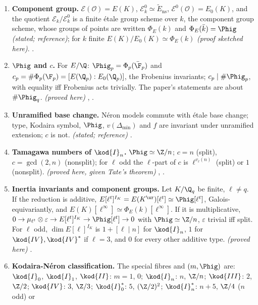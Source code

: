\begin{enumerate}[label=\textbf{\thechapter.\arabic*}]
N\'eron mapping property) exists and is unique; it is the smooth locus of the minimal regular model. \emph{(stated; reference)}
, .
\item \textbf{Component group.} $\mathcal E(\mathcal O)=E(K)$, $\mathcal E_k^0\simeq\tilde E_{\mathrm{ns}}$, $\mathcal E^0(\mathcal O)=E_0(K)$, and
the quotient $\mathcal E_k/\mathcal E_k^0$ is a finite \'etale group scheme over $k$, the component group scheme, whose groups of points
are written $\Phi_E(k)$ and $\Phi_E(\bar k)=\Phig$ \emph{(stated; reference)}; for $k$ finite $E(K)/E_0(K)\simeq\Phi_E(k)$
\emph{(proof sketched here)}. .
\item \textbf{$\Phig$ and $c$.} For $E/\Q$: $\Phig_p=\Phi_p(\bar\F_p)$ and $c_p=\#\Phi_p(\F_p)=[E(\Q_p):E_0(\Q_p)]$, the Frobenius invariants;
$c_p\mid\#\Phig_p$, with equality iff Frobenius acts trivially. The paper's statements are about $\#\Phig_q$. \emph{(proved here)}
, .
\item \textbf{Unramified base change.} N\'eron models commute with \'etale base change; type, Kodaira symbol, $\Phig$, $v(\Delta_{\min})$ and $f$
are invariant under unramified extension; $c$ is not. \emph{(stated; reference)} .
\item \textbf{Tamagawa numbers of $\kod{I}_n$.} $\Phig\simeq\Z/n$; $c=n$ (split), $c=\gcd(2,n)$ (nonsplit); for $\ell$ odd the $\ell$-part of $c$
is $\ell^{v_\ell(n)}$ (split) or $1$ (nonsplit). \emph{(proved here, given Tate's theorem)} ,
.
\item \textbf{Inertia invariants and component groups.} Let $K/\Q_q$ be finite, $\ell\ne q$. If the reduction is additive,
$E[\ell^t]^{I_K}=E(K^{\ur})[\ell^t]\simeq\Phig[\ell^t]$, Galois-equivariantly, and $E(K)[\ell^\infty]\simeq\Phi_E(k)[\ell^\infty]$. If it is
multiplicative, $0\to\mu_{\ell^t}\otimes\varepsilon\to E[\ell^t]^{I_K}\to\Phig[\ell^t]\to0$ with $\Phig\simeq\Z/n$, $\varepsilon$ trivial iff split.
For $\ell$ odd, $\dim E[\ell]^{I_K}$ is $1+[\ell\mid n]$ for $\kod{I}_n$, $1$ for $\kod{IV},\kod{IV}^*$ if $\ell=3$, and $0$ for every other
additive type. \emph{(proved here)} .
\item \textbf{Kodaira-N\'eron classification.} The special fibres and $(m,\Phig)$ are: $\kod{I}_0$, $\kod{I}_1$, $\kod{II}$: $m=1$, $0$;
$\kod{I}_n$: $n$, $\Z/n$; $\kod{III}$: $2$, $\Z/2$; $\kod{IV}$: $3$, $\Z/3$; $\kod{I}_0^*$: $5$, $(\Z/2)^2$; $\kod{I}_n^*$: $n+5$, $\Z/4$ ($n$ odd) or

\end{enumerate}
